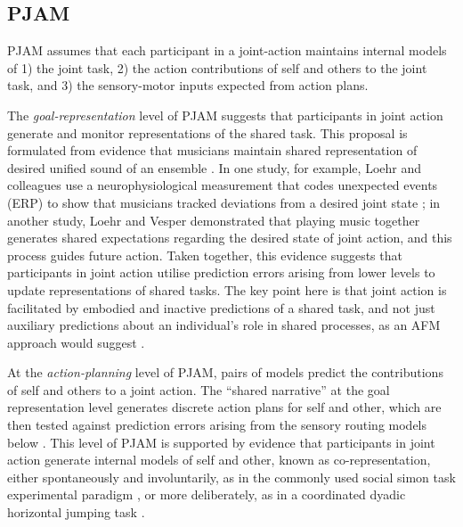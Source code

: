 \subsection{PJAM\label{app2:PJAM}}

PJAM assumes that each participant in a joint-action maintains internal models of 1) the joint task, 2) the action contributions of self and others to the joint task, and  3) the sensory-motor inputs expected from action plans.

The \textit{goal-representation} level of PJAM suggests that participants in joint action generate and monitor representations of the shared task. This proposal is formulated from evidence that musicians maintain shared representation of desired unified sound of an ensemble \citep{Keller2008}.  In one study, for example, Loehr and colleagues  use a neurophysiological measurement that codes unexpected events (ERP) to show that musicians tracked deviations from a desired joint state \citep{Loehr2013}; in another study, Loehr and Vesper \textcite{Loehr2016} demonstrated that playing music together generates shared expectations regarding the desired state of joint action, and this process guides future action.  Taken together, this evidence suggests that participants in joint action utilise prediction errors arising from lower levels to update representations of shared tasks.  The key point here is that joint action is facilitated by embodied and inactive predictions of a shared task, and not just auxiliary predictions about an individual's role in shared processes, as an AFM approach would suggest \citep{Keller2016}.


At the \textit{action-planning} level of PJAM, pairs of models predict the contributions of self and others to a joint action.  The ``shared narrative'' at the goal representation level generates discrete action plans for self and other, which are then tested against prediction errors arising from the sensory routing models below \citep{Pesquita2017}.  This level of PJAM is supported by evidence that participants in joint action generate internal models of self and other, known as co-representation, either spontaneously and involuntarily, as in the commonly used social simon task experimental paradigm \citep{Sebanz2003,Atmaca2008}, or more deliberately, as in a coordinated dyadic horizontal jumping task \citep{Vesper2012}.

